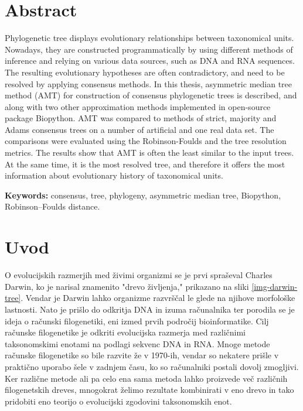 \documentclass[a4paper, 12pt]{book}
\newcommand{\tkeywordsEn}{consensus, tree, phylogeny, asymmetric median tree, Biopython, Robinson–Foulds distance}
\newcommand{\clearemptydoublepage}{\newpage{\pagestyle{empty}\cleardoublepage}}
\begin{document}
\chapter*{Abstract}

Phylogenetic tree displays evolutionary relationships between taxonomical
units. Nowadays, they are constructed programmatically by using different 
methods of inference and relying on various data sources, such as DNA and 
RNA sequences. The resulting evolutionary hypotheses are often contradictory, 
and need to be resolved by applying consensus methods. In this thesis,
asymmetric median tree method (AMT) for construction of consensus phylogenetic
trees is described, and along with two other approximation methods
implemented in open-source package Biopython. AMT was compared to methods 
of strict, majority and Adams consensus trees on a number of artificial 
and one real data set. The comparisons were evaluated using the Robinson-Foulds 
and the tree resolution metrics. The results show that AMT is often the least 
similar to the input trees. At the same time, it is the most resolved tree, 
and therefore it offers the most information about evolutionary history of 
taxonomical units.

\bigskip

\noindent\textbf{Keywords:} \tkeywordsEn.
\clearemptydoublepage

\mainmatter
\setcounter{page}{1}
\pagestyle{fancy}

\chapter{Uvod}
O evolucijskih razmerjih med živimi organizmi se je prvi spraševal Charles Darwin,
ko je narisal znamenito "drevo življenja," prikazano na sliki \ref{img-darwin-tree}.
Vendar je Darwin lahko organizme razvrščal le glede na njihove morfološke lastnosti.
Nato je prišlo do odkritja DNA in izuma računalnika ter porodila se je ideja o računski
filogenetiki, eni izmed prvih področij bioinformatike. Cilj računske filogenetike je 
odkriti evolucijska razmerja med različnimi taksonomskimi enotami na podlagi sekvenc DNA in RNA.
Mnoge metode računske filogenetike so bile razvite že v 1970-ih, vendar so
nekatere prišle v praktično uporabo šele v zadnjem času, ko so računalniki postali dovolj zmogljivi.
Ker različne metode ali pa celo ena sama metoda lahko proizvede več 
različnih filogenetskih dreves, mnogokrat želimo rezultate kombinirati v eno drevo in 
tako pridobiti eno teorijo o evolucijski zgodovini taksonomskih enot. 
\end{document}
